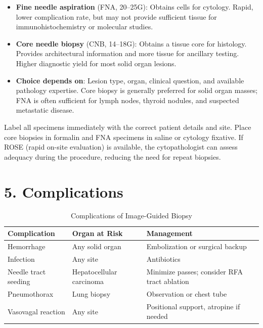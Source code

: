 \begin{itemize}
  \item \textbf{Fine needle aspiration} (FNA, 20--25G): Obtains cells for cytology. Rapid, lower complication rate, but may not provide sufficient tissue for immunohistochemistry or molecular studies.
  \item \textbf{Core needle biopsy} (CNB, 14--18G): Obtains a tissue core for histology. Provides architectural information and more tissue for ancillary testing. Higher diagnostic yield for most solid organ lesions.
  \item \textbf{Choice depends on}: Lesion type, organ, clinical question, and available pathology expertise. Core biopsy is generally preferred for solid organ masses; FNA is often sufficient for lymph nodes, thyroid nodules, and suspected metastatic disease.
\end{itemize}

\begin{pearlbox}
Label all specimens immediately with the correct patient details and site. Place core biopsies in formalin and FNA specimens in saline or cytology fixative. If ROSE (rapid on-site evaluation) is available, the cytopathologist can assess adequacy during the procedure, reducing the need for repeat biopsies.
\end{pearlbox}


\section{5. Complications}

\begin{table}[h]
\centering
\begin{tabular}{@{}p{}p{}p{}@{}}
\hline
\textbf{Complication} & \textbf{Organ at Risk} & \textbf{Management} \\
\hline
Hemorrhage & Any solid organ & Embolization or surgical backup \\
Infection & Any site & Antibiotics \\
Needle tract seeding & Hepatocellular carcinoma & Minimize passes; consider RFA tract ablation \\
Pneumothorax & Lung biopsy & Observation or chest tube \\
Vasovagal reaction & Any site & Positional support, atropine if needed \\
\hline
\end{tabular}
\caption{Complications of Image-Guided Biopsy}
\end{table}

